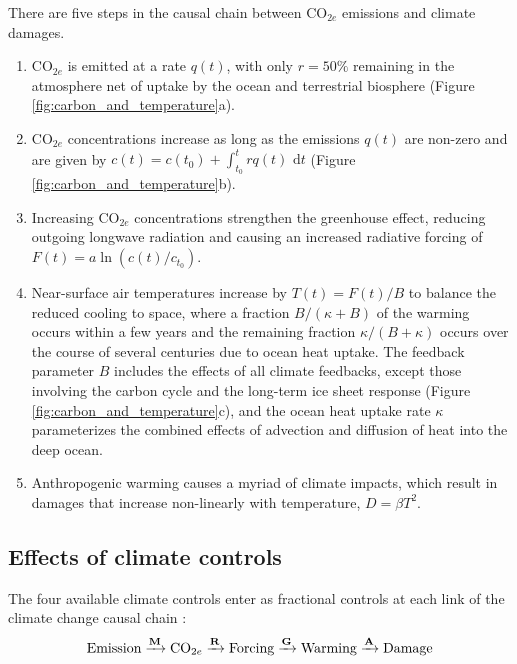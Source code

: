 \documentclass[9pt,twocolumn,twoside,lineno]{pnas-new}
\begin{document}
There are five steps in the causal chain between CO$_{2e}$ emissions and climate damages.
\begin{enumerate}
    \item CO$_{2e}$ is emitted at a rate $q(t)$, with only $r = 50\%$ remaining in the atmosphere net of uptake by the ocean and terrestrial biosphere (Figure \ref{fig:carbon_and_temperature}a).
    \item CO$_{2e}$ concentrations increase as long as the emissions $q(t)$ are non-zero and are given by $c(t) = c(t_{0}) + \int_{t_{0}}^{t} rq(t)\text{ d}t$ (Figure \ref{fig:carbon_and_temperature}b).
    \item Increasing CO$_{2e}$ concentrations strengthen the greenhouse effect, reducing outgoing longwave radiation and causing an increased radiative forcing of $F(t) = a \ln(c(t)/c_{t_{0}})$. 
    \item Near-surface air temperatures increase by $T(t) = F(t)/B$ to balance the reduced cooling to space, where a fraction $B/(\kappa + B)$ of the warming occurs within a few years and the remaining fraction $\kappa/(B + \kappa)$ occurs over the course of several centuries due to ocean heat uptake. The feedback parameter $B$ includes the effects of all climate feedbacks, except those involving the carbon cycle and the long-term ice sheet response (Figure \ref{fig:carbon_and_temperature}c), and the ocean heat uptake rate $\kappa$ parameterizes the combined effects of advection and diffusion of heat into the deep ocean.
    \item Anthropogenic warming causes a myriad of climate impacts, which result in damages that increase non-linearly with temperature, $D = \beta T^{2}$.
\end{enumerate} 

\subsection*{Effects of climate controls}

The four available climate controls enter as fractional controls at each link of the climate change causal chain \cite[similar to][]{moreno-cruz_economic_2018}:
\begin{equation}
    \text{Emission}
    \xrightarrow{\text{\textbf{M}}}
    \text{CO$_{2e}$}
    \xrightarrow{\text{\textbf{R}}}
    \text{Forcing}
    \xrightarrow{\text{\textbf{G}}}
    \text{Warming}
    \xrightarrow{\text{\textbf{A}}}
    \text{Damage}
\end{equation}
\end{document}
